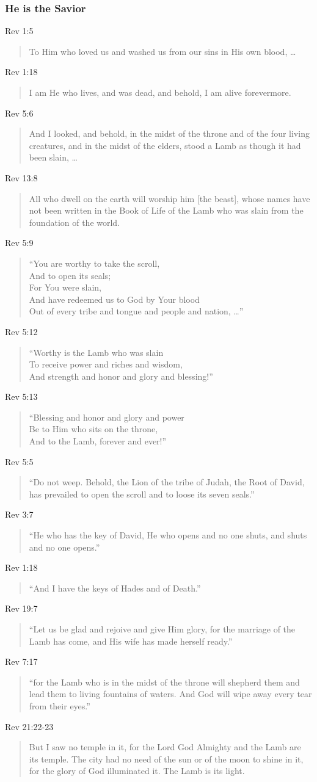 \documentclass{article}
\newcommand{\I}{\item}
\newcommand{\Q}[1]{\begin{quote} #1 \end{quote}}
\begin{document}
\subsubsection{He is the Savior}
\I Rev 1:5 \Q{To Him who loved us and washed us from our sins 
                in His own blood, \ldots}
\I Rev 1:18 \Q{I am He who lives, and was dead, and behold, 
                I am alive forevermore.}
\I Rev 5:6 \Q{And I looked, and behold, in the midst of the throne
                and of the four living creatures, and in the midst of the
                elders, stood a Lamb as though it had been slain, \ldots}
\I Rev 13:8 \Q{All who dwell on the earth will worship him [the beast], 
                whose names have not been written in the Book of Life
                of the Lamb who was slain from the foundation of the world.}
\I Rev 5:9 \Q{``You are worthy to take the scroll, \\
                And to open its seals; \\
                For You were slain, \\
                And have redeemed us to God by Your blood \\
                Out of every tribe and tongue and people and nation, \ldots''}
\I Rev 5:12 \Q{``Worthy is the Lamb who was slain \\
                To receive power and riches and wisdom, \\
                And strength and honor and glory and blessing!''}
\I Rev 5:13 \Q{``Blessing and honor and glory and power \\
                Be to Him who sits on the throne, \\
                And to the Lamb, forever and ever!''}
\I Rev 5:5 \Q{``Do not weep. Behold, the Lion of the tribe of Judah,
                the Root of David, has prevailed to open the scroll 
                and to loose its seven seals.''}
\I Rev 3:7 \Q{``He who has the key of David, He who opens and no one shuts, 
                and shuts and no one opens.''}
\I Rev 1:18 \Q{``And I have the keys of Hades and of Death.''}
\I Rev 19:7 \Q{``Let us be glad and rejoive and give Him glory,
                for the marriage of the Lamb has come,
                and His wife has made herself ready.''}
\I Rev 7:17 \Q{``for the Lamb who is in the midst of the throne 
                will shepherd them and lead them to living fountains of waters.
                And God will wipe away every tear from their eyes.''}
\I Rev 21:22-23 \Q{But I saw no temple in it, for the Lord God Almighty 
                and the Lamb are its temple. The city had no need 
                of the sun or of the moon to shine in it, 
                for the glory of God illuminated it. The Lamb is its light.}
\end{document}
